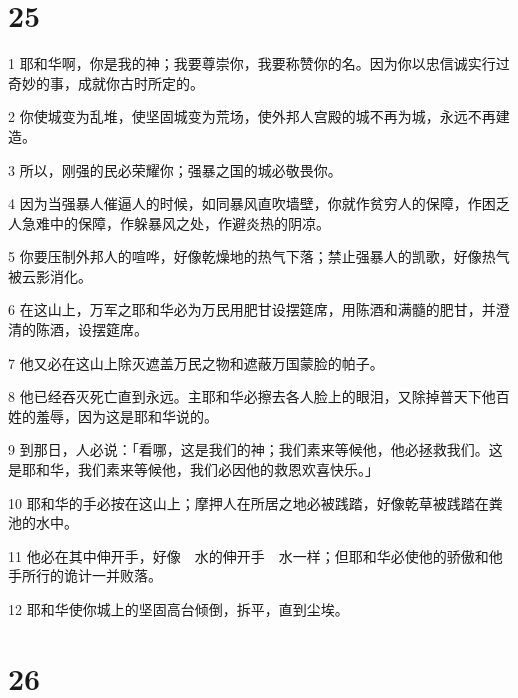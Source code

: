 \chapter{25}

\par 1 耶和华啊，你是我的神；我要尊崇你，我要称赞你的名。因为你以忠信诚实行过奇妙的事，成就你古时所定的。
\par 2 你使城变为乱堆，使坚固城变为荒场，使外邦人宫殿的城不再为城，永远不再建造。
\par 3 所以，刚强的民必荣耀你；强暴之国的城必敬畏你。
\par 4 因为当强暴人催逼人的时候，如同暴风直吹墙壁，你就作贫穷人的保障，作困乏人急难中的保障，作躲暴风之处，作避炎热的阴凉。
\par 5 你要压制外邦人的喧哗，好像乾燥地的热气下落；禁止强暴人的凯歌，好像热气被云影消化。
\par 6 在这山上，万军之耶和华必为万民用肥甘设摆筵席，用陈酒和满髓的肥甘，并澄清的陈酒，设摆筵席。
\par 7 他又必在这山上除灭遮盖万民之物和遮蔽万国蒙脸的帕子。
\par 8 他已经吞灭死亡直到永远。主耶和华必擦去各人脸上的眼泪，又除掉普天下他百姓的羞辱，因为这是耶和华说的。
\par 9 到那日，人必说：「看哪，这是我们的神；我们素来等候他，他必拯救我们。这是耶和华，我们素来等候他，我们必因他的救恩欢喜快乐。」
\par 10 耶和华的手必按在这山上；摩押人在所居之地必被践踏，好像乾草被践踏在粪池的水中。
\par 11 他必在其中伸开手，好像　水的伸开手　水一样；但耶和华必使他的骄傲和他手所行的诡计一并败落。
\par 12 耶和华使你城上的坚固高台倾倒，拆平，直到尘埃。

\chapter{26}

